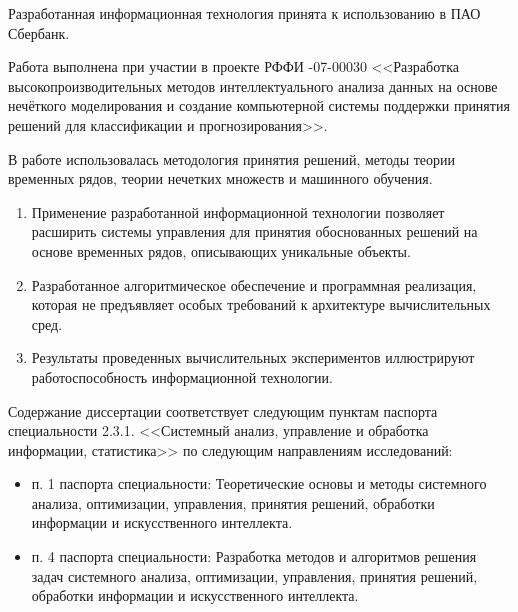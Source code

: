 Разработанная информационная технология принята к использованию в ПАО Сбербанк.

Работа выполнена при участии в проекте РФФИ -07-00030 <<Разработка высокопроизводительных методов интеллектуального анализа данных на основе нечёткого моделирования и создание компьютерной системы поддержки принятия решений для классификации и прогнозирования>>.



{\methods} В работе использовалась методология принятия решений, методы теории временных рядов, теории нечетких множеств и машинного обучения. %

{}
\begin{enumerate}[beginpenalty=10000] %
	\item Применение разработанной информационной технологии позволяет расширить системы управления для принятия обоснованных решений на основе временных рядов, описывающих уникальные объекты. %
	
	\item Разработанное алгоритмическое обеспечение и программная реализация, которая не предъявляет особых требований к архитектуре вычислительных сред.
	
	\item Результаты проведенных вычислительных экспериментов иллюстрируют работоспособность информационной технологии.
\end{enumerate}

{\specialityRelation} Содержание диссертации соответствует следующим пунктам паспорта специальности 2.3.1. <<Системный анализ, управление и обработка информации, статистика>> по следующим направлениям исследований:
\begin{itemize}
	\item п. 1 паспорта специальности: Теоретические основы и методы системного анализа, оптимизации, 	управления, принятия решений, обработки информации и искусственного интеллекта.
	\item п. 4 паспорта специальности: Разработка методов и алгоритмов решения задач системного анализа, оптимизации, управления, принятия решений, обработки информации и искусственного интеллекта.
\end{itemize}

